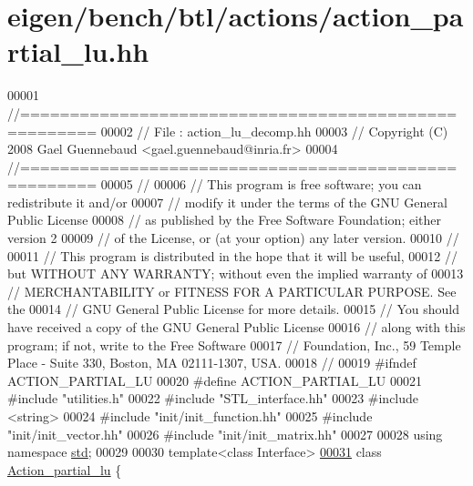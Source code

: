 \hypertarget{eigen_2bench_2btl_2actions_2action__partial__lu_8hh_source}{}\section{eigen/bench/btl/actions/action\+\_\+partial\+\_\+lu.hh}
\label{eigen_2bench_2btl_2actions_2action__partial__lu_8hh_source}

\begin{DoxyCode}
00001 \textcolor{comment}{//=====================================================}
00002 \textcolor{comment}{// File   :  action\_lu\_decomp.hh}
00003 \textcolor{comment}{// Copyright (C) 2008 Gael Guennebaud <gael.guennebaud@inria.fr>}
00004 \textcolor{comment}{//=====================================================}
00005 \textcolor{comment}{//}
00006 \textcolor{comment}{// This program is free software; you can redistribute it and/or}
00007 \textcolor{comment}{// modify it under the terms of the GNU General Public License}
00008 \textcolor{comment}{// as published by the Free Software Foundation; either version 2}
00009 \textcolor{comment}{// of the License, or (at your option) any later version.}
00010 \textcolor{comment}{//}
00011 \textcolor{comment}{// This program is distributed in the hope that it will be useful,}
00012 \textcolor{comment}{// but WITHOUT ANY WARRANTY; without even the implied warranty of}
00013 \textcolor{comment}{// MERCHANTABILITY or FITNESS FOR A PARTICULAR PURPOSE.  See the}
00014 \textcolor{comment}{// GNU General Public License for more details.}
00015 \textcolor{comment}{// You should have received a copy of the GNU General Public License}
00016 \textcolor{comment}{// along with this program; if not, write to the Free Software}
00017 \textcolor{comment}{// Foundation, Inc., 59 Temple Place - Suite 330, Boston, MA  02111-1307, USA.}
00018 \textcolor{comment}{//}
00019 \textcolor{preprocessor}{#ifndef ACTION\_PARTIAL\_LU}
00020 \textcolor{preprocessor}{#define ACTION\_PARTIAL\_LU}
00021 \textcolor{preprocessor}{#include "utilities.h"}
00022 \textcolor{preprocessor}{#include "STL\_interface.hh"}
00023 \textcolor{preprocessor}{#include <string>}
00024 \textcolor{preprocessor}{#include "init/init\_function.hh"}
00025 \textcolor{preprocessor}{#include "init/init\_vector.hh"}
00026 \textcolor{preprocessor}{#include "init/init\_matrix.hh"}
00027 
00028 \textcolor{keyword}{using namespace }\hyperlink{namespacestd}{std};
00029 
00030 \textcolor{keyword}{template}<\textcolor{keyword}{class} Interface>
\hyperlink{class_action__partial__lu}{00031} \textcolor{keyword}{class }\hyperlink{class_action__partial__lu}{Action\_partial\_lu} \{

\end{DoxyCode}
